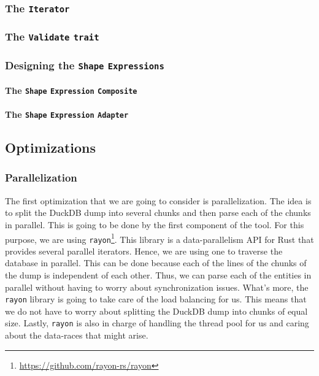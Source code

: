 \subsubsection{The \texttt{Iterator}}

\subsubsection{The \texttt{Validate} \texttt{trait}}

\subsubsection{Designing the \texttt{Shape} \texttt{Expressions}}

\paragraph{The \texttt{Shape} \texttt{Expression} \texttt{Composite}}

\paragraph{The \texttt{Shape} \texttt{Expression} \texttt{Adapter}}

\subsection{Optimizations}

\subsubsection{Parallelization}

The first optimization that we are going to consider is parallelization. The idea is to split the DuckDB dump into several chunks and then parse each of the chunks in parallel. This is going to be done by the first component of the tool. For this purpose, we are using \texttt{rayon}\footnote{\url{https://github.com/rayon-rs/rayon}}. This library is a data-parallelism API for Rust that provides several parallel iterators. Hence, we are using one to traverse the database in parallel. This can be done because each of the lines of the chunks of the dump is independent of each other. Thus, we can parse each of the entities in parallel without having to worry about synchronization issues. What's more, the \texttt{rayon} library is going to take care of the load balancing for us. This means that we do not have to worry about splitting the DuckDB dump into chunks of equal size. Lastly, \texttt{rayon} is also in charge of handling the thread pool for us and caring about the data-races that might arise.

